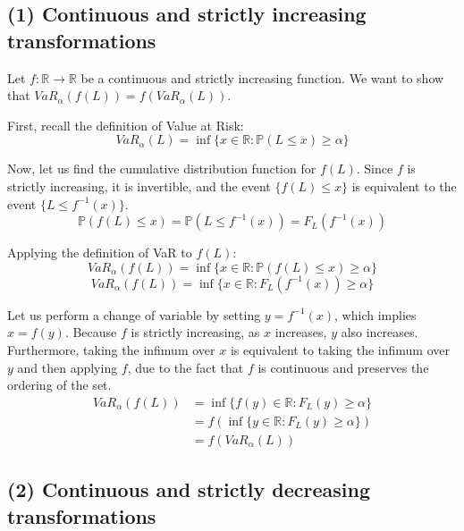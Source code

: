 \subsection*{(1) Continuous and strictly increasing transformations}

Let $f: \mathbb{R} \rightarrow \mathbb{R}$ be a continuous and strictly increasing function. We want to show that $VaR_{\alpha}(f(L)) = f(VaR_{\alpha}(L))$.

First, recall the definition of Value at Risk:
\begin{equation*}
VaR_{\alpha}(L) = \inf\{x \in \mathbb{R} : \mathbb{P}(L \le x) \ge \alpha\}
\end{equation*}

Now, let us find the cumulative distribution function for $f(L)$. Since $f$ is strictly increasing, it is invertible, and the event $\{f(L) \le x\}$ is equivalent to the event $\{L \le f^{-1}(x)\}$.
\begin{equation*}
\mathbb{P}(f(L) \le x) = \mathbb{P}(L \le f^{-1}(x)) = F_L(f^{-1}(x))
\end{equation*}

Applying the definition of VaR to $f(L)$:
\begin{equation*}
VaR_{\alpha}(f(L)) = \inf\{x \in \mathbb{R} : \mathbb{P}(f(L) \le x) \ge \alpha\}
\end{equation*}
\begin{equation*}
VaR_{\alpha}(f(L)) = \inf\{x \in \mathbb{R} : F_L(f^{-1}(x)) \ge \alpha\}
\end{equation*}

Let us perform a change of variable by setting $y = f^{-1}(x)$, which implies $x = f(y)$. Because $f$ is strictly increasing, as $x$ increases, $y$ also increases. Furthermore, taking the infimum over $x$ is equivalent to taking the infimum over $y$ and then applying $f$, due to the fact that $f$ is continuous and preserves the ordering of the set.
\begin{align*}
VaR_{\alpha}(f(L)) &= \inf\{f(y) \in \mathbb{R} : F_L(y) \ge \alpha\} \\
&= f\left( \inf\{y \in \mathbb{R} : F_L(y) \ge \alpha\} \right) \\
&= f(VaR_{\alpha}(L))
\end{align*}


\subsection*{(2) Continuous and strictly decreasing transformations}

